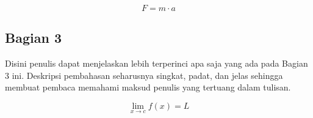 \begin{equation}
  F = m \cdot a
  \label{eq:newton}
\end{equation}

\subsection{Bagian 3}

Disini penulis dapat menjelaskan lebih terperinci apa saja yang ada pada Bagian 3 ini.
Deskripsi pembahasan seharusnya singkat, padat, dan jelas sehingga membuat pembaca
memahami maksud penulis yang tertuang dalam tulisan.

\begin{equation}
  \lim_{x \to c} f(x) = L
  \label{eq:limit}
\end{equation}